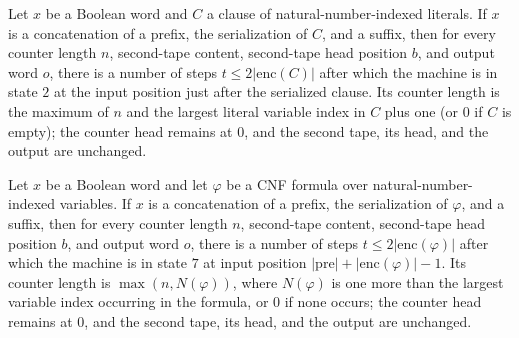 \begin{lemma}
\label{Complexity.satRed_maxClause}
\leanok
{}
Let $x$ be a Boolean word and $C$ a clause of natural-number-indexed literals. If $x$ is
a concatenation of a prefix, the serialization of $C$, and a suffix, then for every
counter length $n$, second-tape content, second-tape head position $b$, and output word
$o$, there is a number of steps $t\le 2|\mathrm{enc}(C)|$ after which the machine is in
state $2$ at the input position just after the serialized clause. Its counter length is
the maximum of $n$ and the largest literal variable index in $C$ plus one (or $0$ if $C$
is empty); the counter head remains at $0$, and the second tape, its head, and the
output are unchanged.
\end{lemma}

\begin{lemma}
\label{Complexity.satRed_maxFormula}
\leanok
{}
Let $x$ be a Boolean word and let $\varphi$ be a CNF formula over natural-number-indexed
variables. If $x$ is a concatenation of a prefix, the serialization of $\varphi$, and a
suffix, then for every counter length $n$, second-tape content, second-tape head
position $b$, and output word $o$, there is a number of steps $t\le
2|\mathrm{enc}(\varphi)|$ after which the machine is in state $7$ at input position
$|\mathrm{pre}|+|\mathrm{enc}(\varphi)|-1$. Its counter length is $\max(n,N(\varphi))$,
where $N(\varphi)$ is one more than the largest variable index occurring in the formula,
or $0$ if none occurs; the counter head remains at $0$, and the second tape, its head,
and the output are unchanged.
\end{lemma}

